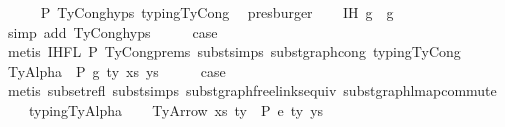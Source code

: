 \begin{isabellebody}
\ \ \ \ \isamarkupfalse%
\ P{}\ TyCong{\isachardot}{\kern0pt}hyps{\isacharparenleft}{\kern0pt}{}{\isacharparenright}{\kern0pt}\ typing{\isachardot}{\kern0pt}TyCong\ \isamarkupfalse%
\ presburger\isanewline
\isanewline
\isanewline
\ \ \isamarkupfalse%
\ IH{\isacharcolon}{\kern0pt}\ {\isachardoublequoteopen}g{}{\isacharprime}{\kern0pt}\ {\isasymsimeq}\ g{}{\isacharprime}{\kern0pt}{\isachardoublequoteclose}\isanewline
\ \ \ \ \ \ \ \isamarkupfalse%
\ {\isacharparenleft}{\kern0pt}simp\ add{\isacharcolon}{\kern0pt}\ TyCong{\isachardot}{\kern0pt}hyps{\isacharparenleft}{\kern0pt}{}{\isacharparenright}{\kern0pt}{\isacharparenright}{\kern0pt}\isanewline
\ \ \isamarkupfalse%
\ \isamarkupfalse%
\ {\isacharquery}{\kern0pt}case\isanewline
\ \ \ \ \isamarkupfalse%
\ {\isacharparenleft}{\kern0pt}metis\ IHFL{}\ P{}\ TyCong{\isachardot}{\kern0pt}prems{\isacharparenleft}{\kern0pt}{}{\isacharparenright}{\kern0pt}\ subst{\isachardot}{\kern0pt}simps{\isacharparenleft}{\kern0pt}{}{\isacharparenright}{\kern0pt}\ subst{\isacharunderscore}{\kern0pt}graph{\isacharunderscore}{\kern0pt}cong\ typing{\isachardot}{\kern0pt}TyCong{\isacharparenright}{\kern0pt}\isanewline
{}\isamarkupfalse%
\isanewline
\ \ \isamarkupfalse%
\ {\isacharparenleft}{\kern0pt}TyAlpha\ {\isasymGamma}{}\ P\ g\ ty\ xs\ ys{\isacharparenright}{\kern0pt}\isanewline
\ \ \isamarkupfalse%
\ \isamarkupfalse%
\ {\isacharquery}{\kern0pt}case\isanewline
\ \ \ \isamarkupfalse%
\ {\isacharparenleft}{\kern0pt}metis\ subset{\isacharunderscore}{\kern0pt}refl\ subst{\isachardot}{\kern0pt}simps{\isacharparenleft}{\kern0pt}{}{\isacharparenright}{\kern0pt}\ subst{\isacharunderscore}{\kern0pt}graph{\isacharunderscore}{\kern0pt}freelinks{\isacharunderscore}{\kern0pt}equiv\ subst{\isacharunderscore}{\kern0pt}graph{\isacharunderscore}{\kern0pt}lmap{\isacharunderscore}{\kern0pt}commute\isanewline
\ \ \ \ typing{\isachardot}{\kern0pt}TyAlpha{\isacharparenright}{\kern0pt}\isanewline
{}\isamarkupfalse%
\isanewline
\ \ \isamarkupfalse%
\ {\isacharparenleft}{\kern0pt}TyArrow\ xs{\isacharprime}{\kern0pt}\ ty{}{\isacharprime}{\kern0pt}\ {\isasymGamma}{\isacharprime}{\kern0pt}\ P\ e{\isacharprime}{\kern0pt}\ ty{}{\isacharprime}{\kern0pt}\ ys{\isacharprime}{\kern0pt}{\isacharparenright}{\kern0pt}\isanewline

\end{isabellebody}
